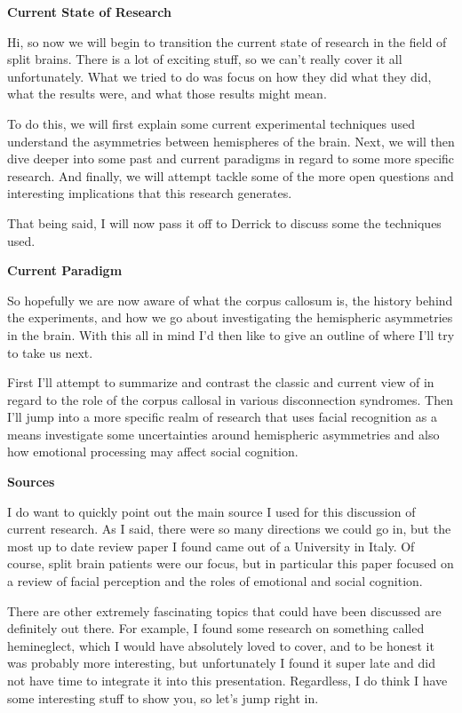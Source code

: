 \documentclass[basic]{inVerba-notes}
\begin{document}
    
\textbf{Current State of Research}

Hi, so now we will begin to transition the current state of research in the field of split brains. There is a lot of exciting stuff, so we can't really cover it all unfortunately. What we tried to do was focus on how they did what they did, what the results were, and what those results might mean.

To do this, we will first explain some current experimental techniques used understand the asymmetries between hemispheres of the brain. Next, we will then dive deeper into some past and current paradigms in regard to some more specific research. And finally, we will attempt tackle some of the more open questions and interesting implications that this research generates.

That being said, I will now pass it off to Derrick to discuss some the techniques used.

\textbf{Current Paradigm}

So hopefully we are now aware of what the corpus callosum is, the history behind the experiments, and how we go about investigating the hemispheric asymmetries in the brain. With this all in mind I'd then like to give an outline of where I'll try to take us next.

First I'll attempt to summarize and contrast the classic and current view of in regard to the role of the corpus callosal in various disconnection syndromes. Then I'll jump into a more specific realm of research that uses facial recognition as a means investigate some uncertainties around hemispheric asymmetries and also how emotional processing may affect social cognition.

\textbf{Sources}
 
I do want to quickly point out the main source I used for this discussion of current research. As I said, there were so many directions we could go in, but the most up to date review paper I found came out of a University in Italy. Of course, split brain patients were our focus, but in particular this paper focused on a review of facial perception and the roles of emotional and social cognition. 

There are other extremely fascinating topics that could have been discussed are definitely out there. For example, I found some research on something called hemineglect, which I would have absolutely loved to cover, and to be honest it was probably more interesting, but unfortunately I found it super late and did not have time to integrate it into this presentation. Regardless, I do think I have some interesting stuff to show you, so let's jump right in. 
\end{document}
